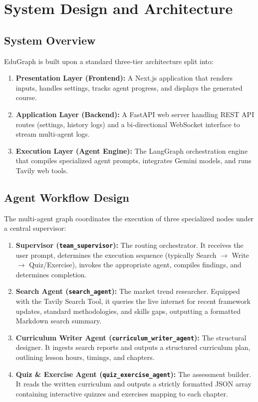 \documentclass[12pt,a4paper]{report}
\begin{document}
\chapter{System Design and Architecture}
\label{ch:design}

\section{System Overview}
EduGraph is built upon a standard three-tier architecture split into:
\begin{enumerate}
    \item \textbf{Presentation Layer (Frontend):} A Next.js application that renders inputs, handles settings, tracks agent progress, and displays the generated course.
    \item \textbf{Application Layer (Backend):} A FastAPI web server handling REST API routes (settings, history logs) and a bi-directional WebSocket interface to stream multi-agent logs.
    \item \textbf{Execution Layer (Agent Engine):} The LangGraph orchestration engine that compiles specialized agent prompts, integrates Gemini models, and runs Tavily web tools.
\end{enumerate}



\section{Agent Workflow Design}
The multi-agent graph coordinates the execution of three specialized nodes under a central supervisor:
\begin{enumerate}
    \item \textbf{Supervisor (\texttt{team\_supervisor}):} The routing orchestrator. It receives the user prompt, determines the execution sequence (typically Search $\rightarrow$ Write $\rightarrow$ Quiz/Exercise), invokes the appropriate agent, compiles findings, and determines completion.
    \item \textbf{Search Agent (\texttt{search\_agent}):} The market trend researcher. Equipped with the Tavily Search Tool, it queries the live internet for recent framework updates, standard methodologies, and skills gaps, outputting a formatted Markdown search summary.
    \item \textbf{Curriculum Writer Agent (\texttt{curriculum\_writer\_agent}):} The structural designer. It ingests search reports and outputs a structured curriculum plan, outlining lesson hours, timings, and chapters.
    \item \textbf{Quiz \& Exercise Agent (\texttt{quiz\_exercise\_agent}):} The assessment builder. It reads the written curriculum and outputs a strictly formatted JSON array containing interactive quizzes and exercises mapping to each chapter.
\end{enumerate}
\end{document}
